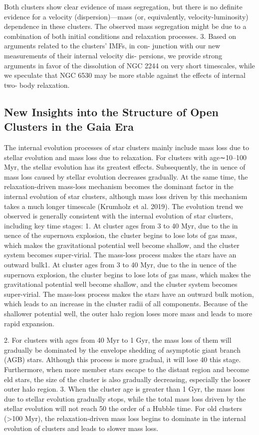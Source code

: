 \documentclass[../Main.tex]{subfiles}
\begin{document}
{Both clusters show clear evidence of mass segregation, but
there is no definite evidence for a velocity (dispersion)—mass (or,
equivalently, velocity-luminosity) dependence in these clusters.
The observed mass segregation might be due to a combination of
both initial conditions and relaxation processes.
3. Based on arguments related to the clusters’ IMFs, in con-
junction with our new measurements of their internal velocity dis-
persions, we provide strong arguments in favor of the dissolution
of NGC 2244 on very short timescales, while we speculate that
NGC 6530 may be more stable against the effects of internal two-
body relaxation.

\subsection{New Insights into the Structure of Open Clusters in the Gaia Era}


The internal evolution processes of star clusters mainly
include mass loss due to stellar evolution and mass loss due to
relaxation. For clusters with age∼10–100 Myr, the stellar
evolution has its greatest effects. Subsequently, the in uence of
mass loss caused by stellar evolution decreases gradually. At
the same time, the relaxation-driven mass-loss mechanism
becomes the dominant factor in the internal evolution of star
clusters, although mass loss driven by this mechanism takes a
much longer timescale (Krumholz et al. 2019). The evolution
trend we observed is generally consistent with the internal
evolution of star clusters, including key time stages:
1. At cluster ages from 3 to 40 Myr, due to the in uence of
the supernova explosion, the cluster begins to lose lots of gas
mass, which makes the gravitational potential well become
shallow, and the cluster system becomes super-virial. The
mass-loss process makes the stars have an outward bulk1. At cluster ages from 3 to 40 Myr, due to the in uence of
the supernova explosion, the cluster begins to lose lots of gas
mass, which makes the gravitational potential well become
shallow, and the cluster system becomes super-virial. The
mass-loss process makes the stars have an outward bulk motion, which leads to an increase in the cluster radii of all
components. Because of the shallower potential well, the outer
halo region loses more mass and leads to more rapid expansion.

2. For clusters with ages from 40 Myr to 1 Gyr, the mass loss
of them will gradually be dominated by the envelope shedding of
asymptotic giant branch (AGB) stars. Although this process is
more gradual, it will lose 40%
this stage. Furthermore, when more member stars escape to the
distant region and become eld stars, the size of the cluster is
also gradually decreasing, especially the looser outer halo region.
3. When the cluster age is greater than 1 Gyr, the mass loss due
to stellar evolution gradually stops, while the total mass loss
driven by the stellar evolution will not reach 50%
the order of a Hubble time. For old clusters (>100 Myr), the
relaxation-driven mass loss begins to dominate in the internal
evolution of clusters and leads to slower mass loss.


}
\end{document}
